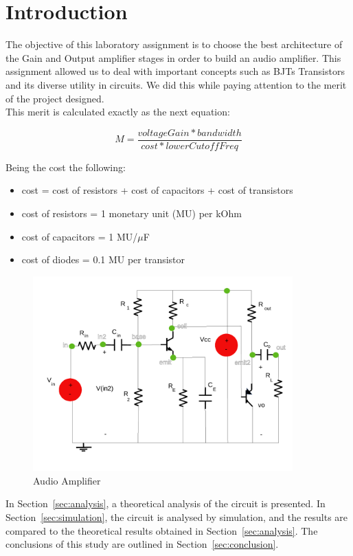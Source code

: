 \newpage
\section{Introduction}
\label{sec:introduction}

The objective of this laboratory assignment is to choose the best architecture of the Gain and Output amplifier
stages in order to build an audio amplifier. This assignment allowed us to deal with important concepts such as BJTs Transistors and its diverse utility in circuits. We did this while paying attention to the merit of the project designed.\\
This merit is calculated exactly as the next equation:

\begin{equation} 
M = \frac{voltageGain*bandwidth}{cost*lowerCutoffFreq}
\label{eq1}
\end{equation}

Being the cost the following:
\begin{itemize}
	\item cost = cost of resistors  + cost of capacitors + cost of transistors
	\item cost of resistors = 1 monetary unit (MU) per kOhm
	\item cost of capacitors = 1 MU/$\mu$F
	\item cost of diodes = 0.1 MU per transistor
	
\end{itemize}

\begin{figure}[H] 
\centering
\includegraphics[width= 10cm]{lab4.pdf} 
\caption{Audio Amplifier}
\label{first}
\end{figure}

In Section~\ref{sec:analysis}, a theoretical analysis of the circuit is
presented. In Section~\ref{sec:simulation}, the circuit is analysed by
simulation, and the results are compared to the theoretical results obtained in
Section~\ref{sec:analysis}. The conclusions of this study are outlined in
Section~\ref{sec:conclusion}. \\


